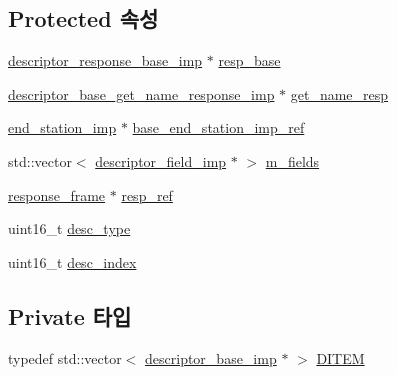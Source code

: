 \subsection*{Protected 속성}
\begin{DoxyCompactItemize}
\item 
\hyperlink{classavdecc__lib_1_1descriptor__response__base__imp}{descriptor\+\_\+response\+\_\+base\+\_\+imp} $\ast$ \hyperlink{classavdecc__lib_1_1descriptor__base__imp_a8b104da8319cda946944548ebb9552f4}{resp\+\_\+base}
\item 
\hyperlink{classavdecc__lib_1_1descriptor__base__get__name__response__imp}{descriptor\+\_\+base\+\_\+get\+\_\+name\+\_\+response\+\_\+imp} $\ast$ \hyperlink{classavdecc__lib_1_1descriptor__base__imp_a7d3a410eb242dc2b7abe9862a1593458}{get\+\_\+name\+\_\+resp}
\item 
\hyperlink{classavdecc__lib_1_1end__station__imp}{end\+\_\+station\+\_\+imp} $\ast$ \hyperlink{classavdecc__lib_1_1descriptor__base__imp_a550c969411f5f3b69f55cc139763d224}{base\+\_\+end\+\_\+station\+\_\+imp\+\_\+ref}
\item 
std\+::vector$<$ \hyperlink{classavdecc__lib_1_1descriptor__field__imp}{descriptor\+\_\+field\+\_\+imp} $\ast$ $>$ \hyperlink{classavdecc__lib_1_1descriptor__base__imp_adce67136eb9c66da9c189b730077b9cd}{m\+\_\+fields}
\item 
\hyperlink{classavdecc__lib_1_1response__frame}{response\+\_\+frame} $\ast$ \hyperlink{classavdecc__lib_1_1descriptor__base__imp_a2642e3a7c10d38553e7ff4a55e875346}{resp\+\_\+ref}
\item 
uint16\+\_\+t \hyperlink{classavdecc__lib_1_1descriptor__base__imp_a9dada313309522d04f1e52fe887442b4}{desc\+\_\+type}
\item 
uint16\+\_\+t \hyperlink{classavdecc__lib_1_1descriptor__base__imp_a2bbd0d8f32f687ca36aaa543c06f764c}{desc\+\_\+index}
\end{DoxyCompactItemize}
\subsection*{Private 타입}
\begin{DoxyCompactItemize}
\item 
typedef std\+::vector$<$ \hyperlink{classavdecc__lib_1_1descriptor__base__imp}{descriptor\+\_\+base\+\_\+imp} $\ast$ $>$ \hyperlink{classavdecc__lib_1_1configuration__descriptor__imp_adc1ad76704bd31cdc58e35393c68070c}{D\+I\+T\+EM}
\end{DoxyCompactItemize}
